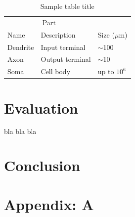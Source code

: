 \documentclass{article}
\begin{document}
\begin{table}[t]
    \caption{Sample table title}
    \label{sample-table}
    \centering
    \begin{tabular}{lll}
        \toprule
        \multicolumn{2}{c}{Part}                   \\
        \cmidrule{1-2}
        Name & Description & Size ($\mu$m) \\
        \midrule
        Dendrite & Input terminal & $\sim$100     \\
        Axon & Output terminal & $\sim$10      \\
        Soma & Cell body & up to $10^6$  \\
        \bottomrule
    \end{tabular}
\end{table}

\section{Evaluation}
\label{sec:evaluation}
bla bla bla

\section{Conclusion}
\label{sec:conclusion}

\printbibliography

\section*{Appendix: A}
\label{sec:appendix:a}
\end{document}
